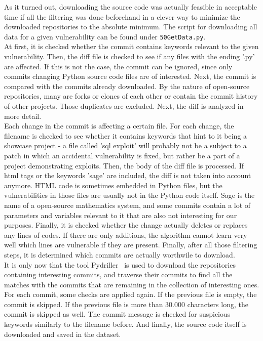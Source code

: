 \documentclass[
a4paper,
pagesize,
pdftex,
12pt,
twoside, %
BCOR=5mm, %
ngerman,
fleqn,
final,
]{scrartcl}
\begin{document}
	As it turned out, downloading the source code was actually feasible in acceptable time if all the filtering was done beforehand in a clever way to minimize the downloaded repositories to the absolute minimum. The script for downloading all data for a given vulnerability can be found under \texttt{50GetData.py}.\\
	At first, it is checked whether the commit contains keywords relevant to the given vulnerability. Then, the diff file is checked to see if any files with the ending '.py' are affected. If this is not the case, the commit can be ignored, since only commits changing Python source code files are of interested. Next, the commit is compared with the commits already downloaded. By the nature of open-source repositories, many are forks or clones of each other or contain the commit history of other projects. Those duplicates are excluded. Next, the diff is analyzed in more detail.\\
	Each change in the commit is affecting a certain file. For each change, the filename is checked to see whether it contains keywords that hint to it being a showcase project - a file called 'sql exploit' will probably not be a subject to a patch in which an accidental vulnerability is fixed, but rather be a part of a project demonstrating exploits. Then, the body of the diff file is processed. If html tags or the keywords 'sage' are included, the diff is not taken into account anymore. HTML code is sometimes embedded in Python files, but the vulnerabilities in those files are usually not in the Python code itself. Sage is the name of a open-source mathematics system, and some commits contain a lot of parameters and variables relevant to it that are also not interesting for our purposes. Finally, it is checked whether the change actually deletes or replaces any lines of codes. If there are only additions, the algorithm cannot learn very well which lines are vulnerable if they are present. Finally, after all those filtering steps, it is determined which commits are actually worthwile to download.\\
	It is only now that the tool Pydriller~\cite{Spadini.2018} is used to download the repositories containing interesting commits, and traverse their commits to find all the matches with the commits that are remaining in the collection of interesting ones. For each commit, some checks are applied again. If the previous file is empty, the commit is skipped. If the previous file is more than 30.000 characters long, the commit is skipped as well. The commit message is checked for suspicious keywords similarly to the filename before. And finally, the source code itself is downloaded and saved in the dataset. 
	
\end{document}
